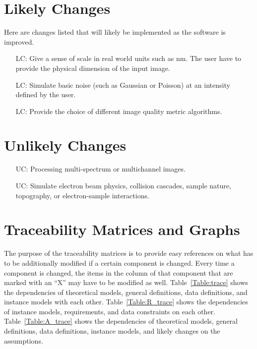 \documentclass[12pt]{article}
\newcounter{lcnum} %
\newcounter{ucnum} %
\begin{document}
\section{Likely Changes}    
Here are changes listed that will likely be implemented as the software is improved.

\noindent \begin{itemize}

\item[LC\refstepcounter{lcnum}\thelcnum\label{LC_realUnits}:] Give a sense of scale in real world units such as \si{nm}. The user have to provide the physical dimension of the input image.

\item[LC\refstepcounter{lcnum}\thelcnum\label{LC_simNoise}:] Simulate basic noise (such as Gaussian or Poisson) at an intensity defined by the user.

\item[LC\refstepcounter{lcnum}\thelcnum\label{LC_imgMetricAlgos}:] Provide the choice of different image quality metric algorithms.

\end{itemize}

\section{Unlikely Changes}    

\noindent \begin{itemize}

\item[UC\refstepcounter{ucnum}\theucnum\label{UC_multichannel}:] Processing multi-spectrum or multichannel images.

\item[UC\refstepcounter{ucnum}\theucnum\label{UC_physics}:] Simulate electron beam physics, collision cascades, sample nature, topography, or electron-sample interactions.

\end{itemize}

\section{Traceability Matrices and Graphs}

The purpose of the traceability matrices is to provide easy references on what
has to be additionally modified if a certain component is changed.  Every time a
component is changed, the items in the column of that component that are marked
with an ``X'' may have to be modified as well.  Table~\ref{Table:trace} shows the
dependencies of theoretical models, general definitions, data definitions, and
instance models with each other. Table~\ref{Table:R_trace} shows the
dependencies of instance models, requirements, and data constraints on each
other. Table~\ref{Table:A_trace} shows the dependencies of theoretical models,
general definitions, data definitions, instance models, and likely changes on
the assumptions.
\end{document}
